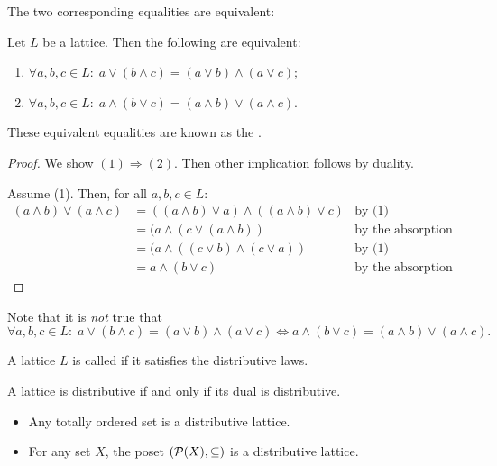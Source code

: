 The two corresponding equalities are equivalent:
\begin{proposition} \label{equivalenceDistributiveLaws}
Let $L$ be a lattice. Then the following are equivalent:
\begin{enumerate}
\item $\forall a,b,c \in L: \; a \vee (b\wedge c) = (a\vee b) \wedge (a\vee c)$;
\item $\forall a,b,c \in L: \; a\wedge (b \vee c) = (a\wedge b)\vee (a\wedge c)$.
\end{enumerate}
\end{proposition}
These equivalent equalities are known as the .
\begin{proof}
We show $(1)\Rightarrow (2)$. Then other implication follows by duality.

Assume (1). Then, for all $a,b,c \in L$:
\begin{align*}
(a\wedge b)\vee (a\wedge c) &= ((a\wedge b)\vee a) \wedge ((a\wedge b)\vee c) & \text{by (1)}\\
&= (a\wedge (c\vee (a\wedge b))  & \text{by the absorption law}\\
&= (a \wedge ((c\vee b) \wedge (c\vee a))  & \text{by (1)}\\
&= a\wedge (b\vee c) & \text{by the absorption law.}
\end{align*}
\end{proof}
Note that it is \emph{not} true that
\[ \forall a,b,c \in L: \; a \vee (b\wedge c) = (a\vee b) \wedge (a\vee c) \iff a\wedge (b \vee c) = (a\wedge b)\vee (a\wedge c). \]

\begin{definition}
A lattice $L$ is called  if it satisfies the distributive laws.
\end{definition}

\begin{lemma}
A lattice is distributive \textup{if and only if} its dual is distributive.
\end{lemma}

\begin{example}
\begin{itemize}
\item Any totally ordered set is a distributive lattice.
\item For any set $X$, the poset $\left( \operatorname{\mathcal{P}}(X), \subseteq \right)$ is a distributive lattice.
\end{itemize}
\end{example}

